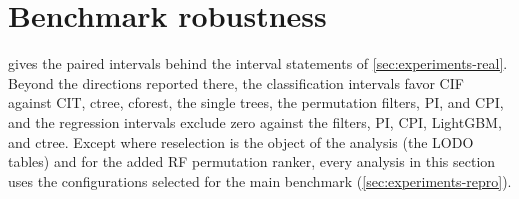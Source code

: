 \section{Benchmark robustness}
\label{app:benchmark-stability}

 gives the paired intervals behind the
interval statements of \cref{sec:experiments-real}. Beyond the directions
reported there, the classification intervals favor CIF against CIT, ctree,
cforest, the single trees, the permutation filters, PI, and CPI, and the
regression intervals exclude zero against the filters, PI, CPI, LightGBM, and
ctree.
Except where reselection is the object of the analysis (the LODO tables) and
for the added RF permutation ranker, every analysis in this section uses the
configurations selected for the main benchmark (\cref{sec:experiments-repro}).


